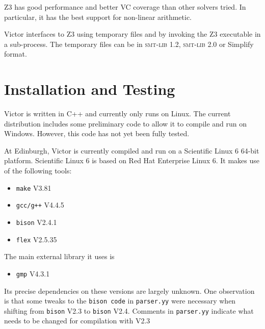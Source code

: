 \documentclass[12pt,fleqn]{article}
\newcommand{\zthree}{\textsc{Z}3}
\newcommand{\smtlib}{\textsc{smt-lib}}
\begin{document}
\zthree{} has good performance and better VC coverage than other
solvers tried.  In particular, it has the best support for non-linear
arithmetic.

Victor interfaces to \zthree{} using temporary files and by invoking
the \zthree{} executable in a sub-process.  The temporary files can be
in \smtlib{} 1.2, \smtlib{} 2.0 or Simplify format.


\section{Installation and Testing}

Victor is written in C++ and currently only runs on Linux.  The
current distribution includes some preliminary code to allow it to
compile and run on Windows.  However, this code has not yet been fully
tested.

At Edinburgh, Victor is currently compiled and run on a Scientific
Linux 6 64-bit platform. Scientific Linux 6 is based on Red Hat
Enterprise Linux 6.  It makes use of the following tools:
\begin{itemize}
\item \texttt{make} V3.81
\item \texttt{gcc/g++} V4.4.5
\item \texttt{bison}  V2.4.1
\item \texttt{flex} V2.5.35
\end{itemize}
The main external library it uses is
\begin{itemize}
\item \texttt{gmp} V4.3.1
\end{itemize}
Its precise dependencies on these versions are largely unknown. 
%
One observation is that some tweaks to the \texttt{bison code} in
\texttt{parser.yy} were necessary when shifting from \texttt{bison}
V2.3 to \texttt{bison} V2.4.  Comments in \texttt{parser.yy} indicate
what needs to be changed for compilation with V2.3
\end{document}
